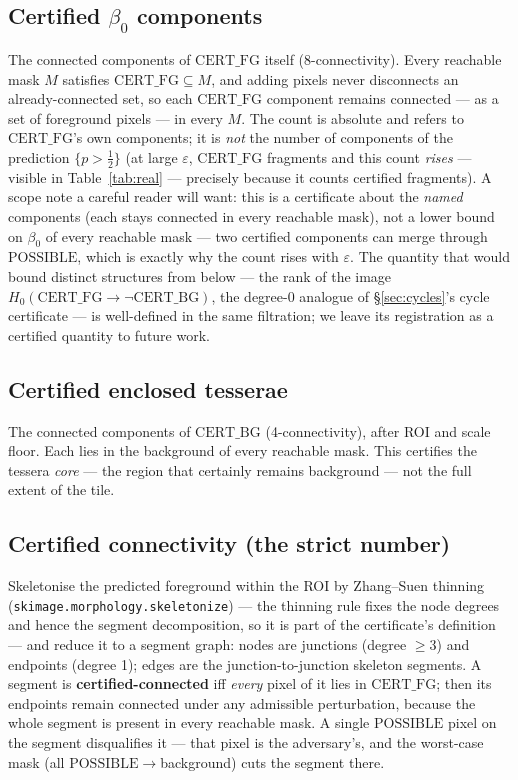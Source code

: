 \documentclass[10pt]{article}
\newcommand{\CFG}{\mathrm{CERT\_FG}}
\newcommand{\CBG}{\mathrm{CERT\_BG}}
\newcommand{\POSS}{\mathrm{POSSIBLE}}
\newcommand{\eps}{\varepsilon}
\begin{document}
\subsection{Certified $\beta_0$ components}
The connected components of $\CFG$ itself (8-connectivity). Every
reachable mask $M$ satisfies $\CFG \subseteq M$, and adding pixels never
disconnects an already-connected set, so each $\CFG$ component remains
connected --- as a set of foreground pixels --- in every $M$. The count is
absolute and refers to $\CFG$'s own components; it is \emph{not} the
number of components of the prediction $\{p>\tfrac12\}$ (at large $\eps$,
$\CFG$ fragments and this count \emph{rises} --- visible in
Table~\ref{tab:real} --- precisely because it counts certified fragments).
A scope note a careful reader will want: this is a certificate about the
\emph{named} components (each stays connected in every reachable mask),
not a lower bound on $\beta_0$ of every reachable mask --- two certified
components can merge through $\POSS$, which is exactly why the count
rises with $\eps$. The quantity that would bound distinct structures from
below --- the rank of the image $H_0(\CFG \to \lnot\CBG)$, the degree-0
analogue of \S\ref{sec:cycles}'s cycle certificate --- is well-defined in
the same filtration; we leave its registration as a certified quantity to
future work.

\subsection{Certified enclosed tesserae}
The connected components of $\CBG$ (4-connectivity), after ROI and scale
floor. Each lies in the background of every reachable mask. This certifies
the tessera \emph{core} --- the region that certainly remains background
--- not the full extent of the tile.

\subsection{Certified connectivity (the strict number)}\label{sec:conn}
Skeletonise the predicted foreground within the ROI by Zhang--Suen thinning
(\texttt{skimage.\allowbreak morphology.\allowbreak skeletonize}) --- the
thinning rule fixes the
node degrees and hence the segment decomposition, so it is part of the
certificate's definition --- and reduce it to a
segment graph: nodes are junctions (degree $\ge 3$) and endpoints (degree
1); edges are the junction-to-junction skeleton segments. A segment is
\textbf{certified-connected} iff \emph{every} pixel of it lies in $\CFG$;
then its endpoints remain connected under any admissible perturbation,
because the whole segment is present in every reachable mask. A single
$\POSS$ pixel on the segment disqualifies it --- that pixel is the
adversary's, and the worst-case mask (all $\POSS\to$background) cuts the
segment there.
\end{document}
